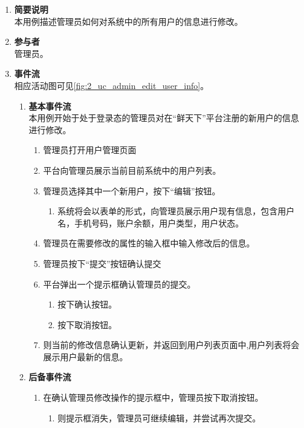 \begin{enumerate}
	\item \textbf{简要说明}  \\ 本用例描述管理员如何对系统中的所有用户的信息进行修改。
	\item \textbf{参与者} \\ 管理员。
	\item \textbf{事件流} \\ 相应活动图可见\autoref{fig:2_uc_admin_edit_user_info}。
	\begin{enumerate} 
        \item \textbf{基本事件流} \\ 本用例开始于处于登录态的管理员对在“鲜天下”平台注册的新用户的信息进行修改。
        \begin{enumerate}
            \item 管理员打开用户管理页面
            \item 平台向管理员展示当前目前系统中的用户列表。
            \item 管理员选择其中一个新用户，按下“编辑”按钮。
            \begin{enumerate}
                \item 系统将会以表单的形式，向管理员展示用户现有信息，包含用户名，手机号码，账户余额，用户类型，用户状态。
            \end{enumerate}
            \item 管理员在需要修改的属性的输入框中输入修改后的信息。
            \item 管理员按下“提交”按钮确认提交
            \item 平台弹出一个提示框确认管理员的提交。
            \begin{enumerate}
                \item 按下确认按钮。
                \item 按下取消按钮。
            \end{enumerate}
            \item 则当前的修改信息确认更新，并返回到用户列表页面中,用户列表将会展示用户最新的信息。
        \end{enumerate}
        \item \textbf{后备事件流}
        \begin{enumerate}
            \item 在确认管理员修改操作的提示框中，管理员按下取消按钮。
            \begin{enumerate}
                \item 则提示框消失，管理员可继续编辑，并尝试再次提交。

\end{enumerate}
\end{enumerate}
\end{enumerate}
\end{enumerate}
